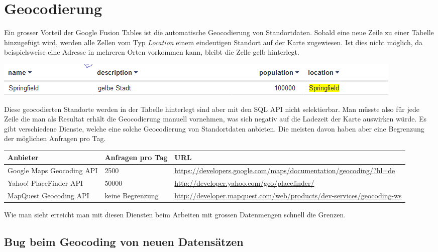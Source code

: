 \section{Geocodierung}
\label{geocodierung}
Ein grosser Vorteil der Google Fusion Tables ist die automatische 
\gls{Geocodierung} von Standortdaten. Sobald eine neue Zeile zu einer Tabelle hinzugefügt wird, werden alle Zellen vom Typ \emph{Location} einem eindeutigen Standort auf der Karte zugewiesen. Ist dies nicht möglich, da beispielsweise eine Adresse in mehreren Orten vorkommen kann, bleibt die Zelle gelb hinterlegt.
 
\includegraphics[scale=0.75]{images/geocoding_failed.png}

Diese geocodierten Standorte werden in der Tabelle hinterlegt sind aber mit den SQL API nicht selektierbar. Man müsste also für jede Zeile die man als Resultat erhält die Geocodierung manuell vornehmen, was sich negativ auf die Ladezeit der Karte auswirken würde.
Es gibt verschiedene Dienste, welche eine solche Geocodierung von Standortdaten anbieten. Die meisten davon haben aber eine Begrenzung der möglichen Anfragen pro Tag.

\begin{longtable}{|l|p{1.9cm}|p{7.3cm}|}
\hline 
\textbf{Anbieter} & \textbf{Anfragen pro Tag} & \textbf{URL} \\ 
\hline 
Google Maps Geocoding API & 2500 & \url{https://developers.google.com/maps/documentation/geocoding/?hl=de} \\ 
\hline 
Yahoo! PlaceFinder API & 50000 & \url{http://developer.yahoo.com/geo/placefinder/} \\ 
\hline 
MapQuest Geocoding API & keine Begrenzung & \url{http://developer.mapquest.com/web/products/dev-services/geocoding-ws} \\ 
\hline 
\end{longtable} 

Wie man sieht erreicht man mit diesen Diensten beim Arbeiten mit grossen Datenmengen schnell die Grenzen.

\subsection{Bug beim Geocoding von neuen Datensätzen}
\label{geocodierung-bug}
